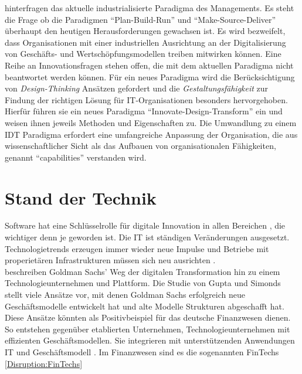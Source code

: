 \citet{Koch2016} hinterfragen das aktuelle industrialisierte Paradigma des Managements. Es steht die Frage ob die Paradigmen \enquote{Plan-Build-Run} und \enquote{Make-Source-Deliver} überhaupt den heutigen Herausforderungen gewachsen ist. Es wird bezweifelt, dass Organisationen mit einer industriellen Ausrichtung an der Digitalisierung von Geschäfts- und Wertschöpfungsmodellen treiben mitwirken können. Eine Reihe an Innovationsfragen stehen offen, die mit dem aktuellen Paradigma nicht beantwortet werden können. Für ein neues Paradigma wird die Berücksichtigung von \emph{Design-Thinking} Ansätzen gefordert und die \emph{Gestaltungsfähigkeit} zur Findung der richtigen Lösung für IT-Organisationen besonders hervorgehoben. Hierfür führen sie ein neues Paradigma \enquote{Innovate-Design-Transform} ein und weisen ihnen jeweils Methoden und Eigenschaften zu. Die Umwandlung zu einem \ac{IDT} Paradigma erfordert eine umfangreiche Anpassung der Organisation, die aus wissenschaftlicher Sicht als das Aufbauen von organisationalen Fähigkeiten, genannt \enquote{capabilities} verstanden wird.

\section{Stand der Technik}
Software hat eine Schlüsselrolle für digitale Innovation in allen Bereichen \cite{Alt2017}, die wichtiger denn je geworden ist. Die IT ist ständigen Veränderungen ausgesetzt. Technologietrends erzeugen immer wieder neue Impulse und Betriebe mit properietären Infrastrukturen müssen sich neu ausrichten \cite{Bussmann2006}.
\medskip
\\
\citet{Gupta:2017} beschreiben Goldman Sachs' Weg der digitalen Transformation hin zu einem Technologieunternehmen und Plattform. 
Die Studie von Gupta und Simonds stellt viele Ansätze vor, mit denen Goldman Sachs erfolgreich neue Geschäftsmodelle entwickelt hat und alte Modelle Strukturen abgeschafft hat. Diese Ansätze könnten als Positivbeispiel für das deutsche Finanzwesen dienen.
\medskip
\\
So entstehen gegenüber etablierten Unternehmen, Technologieunternehmen mit effizienten Geschäftsmodellen. Sie integrieren mit unterstützenden Anwendungen IT und Geschäftsmodell \cite{Bussmann2006}. Im Finanzwesen sind es die sogenannten FinTechs \ref{Disruption:FinTechs}

